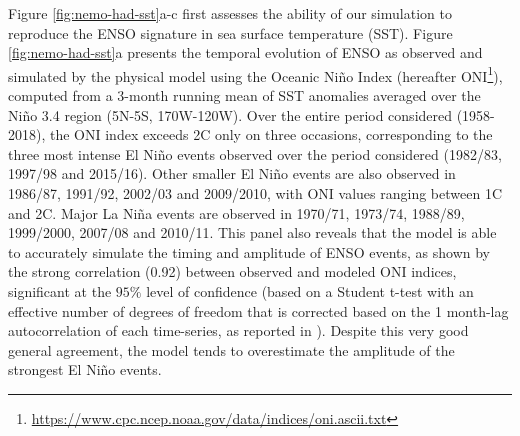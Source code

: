  Figure \ref{fig:nemo-had-sst}a-c first assesses the ability of our simulation to reproduce the ENSO signature in sea surface temperature (SST). Figure \ref{fig:nemo-had-sst}a presents the temporal evolution of ENSO as observed and simulated by the physical model using the Oceanic Niño Index (hereafter ONI\footnote{\url{https://www.cpc.ncep.noaa.gov/data/indices/oni.ascii.txt}}), computed from a 3-month running mean of SST anomalies averaged over the Niño 3.4 region (5N-5S, 170W-120W). Over the entire period considered (1958-2018), the ONI index exceeds 2\degree{}C only on three occasions, corresponding to the three most intense El Niño events observed over the period considered (1982/83, 1997/98 and 2015/16). Other smaller El Niño events are also observed in 1986/87, 1991/92, 2002/03 and 2009/2010, with ONI values ranging between 1\degree{}C and 2\degree{}C. Major La Niña events are observed in 1970/71, 1973/74, 1988/89, 1999/2000, 2007/08 and 2010/11. This panel also reveals that the model is able to accurately simulate the timing and amplitude of ENSO events, as shown by the strong correlation (0.92) between observed and modeled ONI indices, significant at the $95\%$ level of confidence (based on a Student t-test with an effective number of degrees of freedom that is corrected based on the 1 month-lag autocorrelation of each time-series, as reported in \citealp{brethertonEffectiveNumberSpatial1999}). Despite this very good general agreement, the model tends to overestimate the amplitude of the strongest El Niño events. 

